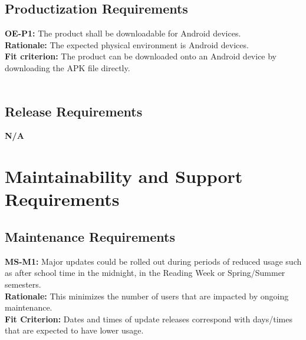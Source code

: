 \documentclass[12pt]{article}
\begin{document}
\subsection{Productization Requirements}
  \textbf{OE-P1:} The product shall be downloadable for Android devices.\\
  \textbf{Rationale:} The expected physical environment is Android devices.\\
  \textbf{Fit criterion:} The product can be downloaded onto an Android device by downloading the APK file directly.\\\\

\subsection{Release Requirements}
  \textbf{N/A}\\

\section{Maintainability and Support Requirements}
\subsection{Maintenance Requirements}
  \textbf{MS-M1:} Major updates could be rolled out during periods of reduced usage such as after school time in the midnight, in the Reading Week or Spring/Summer semesters.\\
  \textbf{Rationale:} This minimizes the number of users that are impacted by ongoing maintenance.\\
  \textbf{Fit Criterion:} Dates and times of update releases correspond with days/times that are expected to have lower usage.\\\\
\end{document}

